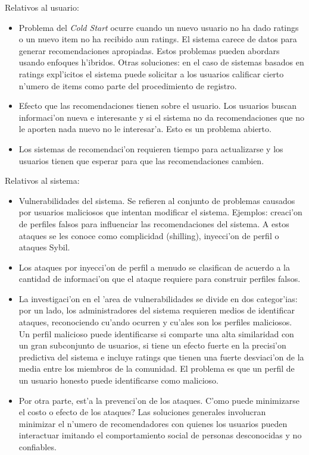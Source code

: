 \documentclass[11pt]{article}
\begin{document}
Relativos al usuario:
\begin{itemize}
\item Problema del \textit{Cold Start} ocurre cuando un nuevo usuario no ha dado ratings o un nuevo item no ha recibido aun ratings. El sistema carece de datos para generar recomendaciones apropiadas. Estos problemas pueden abordars usando enfoques h'ibridos. Otras soluciones: en el caso de sistemas basados en ratings expl'icitos el sistema puede solicitar a los usuarios calificar cierto n'umero de items como parte del procedimiento de registro. 
\item Efecto que las recomendaciones tienen sobre el usuario. Los usuarios buscan informaci'on nueva e interesante y si el sistema no da recomendaciones que no le aporten nada nuevo no le interesar'a. Esto es un problema abierto. 
\item Los sistemas de recomendaci'on requieren tiempo para actualizarse y los usuarios tienen que esperar para que las recomendaciones cambien.
\end{itemize}
Relativos al sistema:
\begin{itemize}
\item Vulnerabilidades del sistema. Se refieren al conjunto de problemas causados por usuarios maliciosos que intentan modificar el sistema. Ejemplos: creaci'on de perfiles falsos para influenciar las recomendaciones del sistema. A estos ataques se les conoce como complicidad (shilling), inyecci'on de perfil o ataques Sybil.
\item Los ataques por inyecci'on de perfil a menudo se clasifican de acuerdo a la cantidad de informaci'on que el ataque requiere para construir perfiles falsos.
\item La investigaci'on en el 'area de vulnerabilidades se divide en dos categor'ias: por un lado, los administradores del sistema requieren medios de identificar ataques, reconociendo cu'ando ocurren y cu'ales son los perfiles maliciosos. Un perfil malicioso puede identificarse si comparte una alta similaridad con un gran subconjunto de usuarios, si tiene un efecto fuerte en la precisi'on predictiva del sistema e incluye ratings que tienen una fuerte desviaci'on de la media entre los miembros de la comunidad. El problema es que un perfil de un usuario honesto puede identificarse como malicioso.
\item Por otra parte, est'a la prevenci'on de los ataques. \textquestiondown C'omo puede minimizarse el costo o efecto de los ataques? Las soluciones generales involucran minimizar el n'umero de recomendadores con quienes los usuarios pueden interactuar imitando el comportamiento social de personas desconocidas y no confiables.
\end{itemize}
\end{document}
